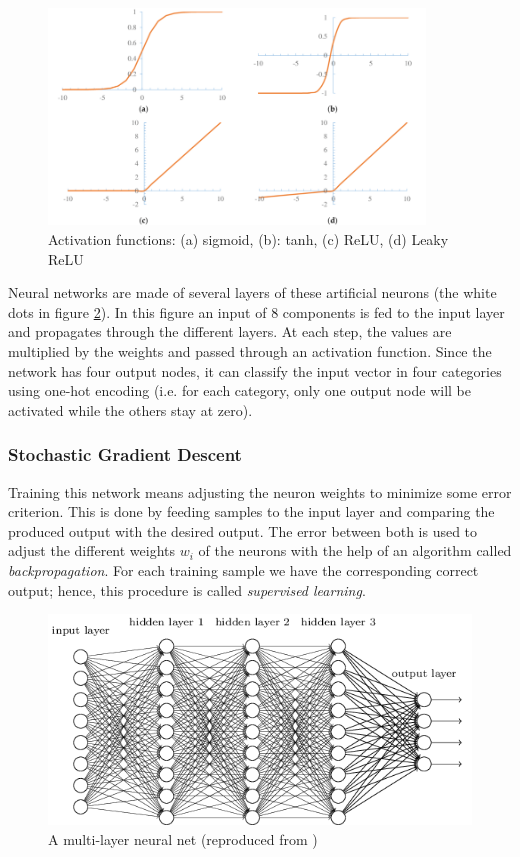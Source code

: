 \begin{figure}[htp]
    \centering
    \includegraphics[width=10cm]{images/activation_funcs.png}
    \caption{Activation functions: (a) sigmoid, (b): tanh, (c) ReLU, (d) Leaky ReLU}
    \label{fig:activation_funcs}
\end{figure}

Neural networks \cite{nielsen2015neural} are made of several layers of these artificial neurons (the white dots in figure \ref{fig:neural_net}). In this figure an input of $8$ components is fed to the input layer and propagates through the different layers. At each step, the values are multiplied by the weights and passed through an activation function. Since the network has four output nodes, it can classify the input vector in four categories using one-hot encoding (i.e. for each category, only one output node will be activated while the others stay at zero).
\subsubsection{Stochastic Gradient Descent}
Training this network means adjusting the neuron weights to minimize some error criterion. This is done by feeding samples to the input layer and comparing the produced output with the desired output. The error between both is used to adjust the different weights $w_i$ of the neurons with the help of an algorithm called \emph{backpropagation}. For each training sample we have the corresponding correct output; hence, this procedure is called \emph{supervised learning}.\\

\begin{figure}[htp]
    \centering
    \includegraphics[width=12cm]{images/neural_net.png}
    \caption{A multi-layer neural net (reproduced from \cite{nielsen2015neural})}
    \label{fig:neural_net}
\end{figure}

